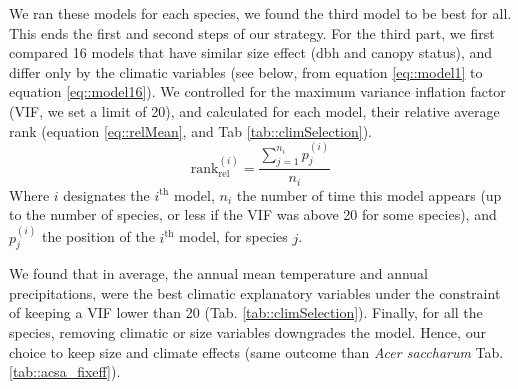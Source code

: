 \begin{refsection}
We ran these models for each species, we found the third model to be best for all. This ends the first and second steps of our strategy. For the third part, we first compared 16 models that have similar size effect (dbh and canopy status), and differ only by the climatic variables (see below, from equation \eqref{eq::model1} to equation \eqref{eq::model16}). We controlled for the maximum variance inflation factor (VIF, we set a limit of 20), and calculated for each model, their relative average rank (equation \eqref{eq::relMean}, and Tab \ref{tab::climSelection}).
\begin{equation} \label{eq::relMean}
	\text{rank}_{\text{rel}}^{(i)} = \dfrac{\sum_{j = 1}^{n_i} p_j^{(i)}}{n_i}
\end{equation}
Where $ i $ designates the $ i^{\text{th}} $ model, $ n_i $ the number of time this model appears (up to the number of species, or less if the VIF was above 20 for some species), and $ p_j^{(i)} $ the position of the $ i^{\text{th}} $ model, for species $ j $.

We found that in average, the annual mean temperature and annual precipitations, were the best climatic explanatory variables under the constraint of keeping a VIF lower than 20 (Tab. \ref{tab::climSelection}). Finally, for all the species, removing climatic or size variables downgrades the model. Hence, our choice to keep size and climate effects (same outcome than \textit{Acer saccharum} Tab. \ref{tab::acsa_fixeff}).


\end{refsection}
